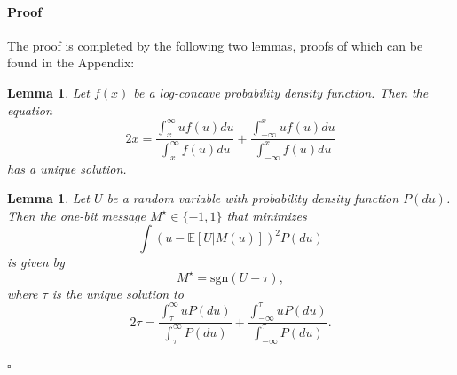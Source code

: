 \documentclass[letterpaper, conference,9pt]{IEEEtran}      %
\newtheorem{lem}[thm]{\bf {Lemma}}
\newenvironment{proof}{\paragraph*{Proof}}{\hfill$\square$ \newline}
\newcommand{\sgn}{\mathrm{sgn} }
\begin{document}
\begin{proof}
The proof is completed by the following two lemmas, proofs of which can be found in the Appendix:
\begin{lem} \label{lem:unique}
Let $f(x)$ be a log-concave probability density function. Then the equation 
\begin{equation}
\label{eq:lem_fixed_point}
2x = \frac{\int_x^\infty uf(u)du}{\int_x^\infty f(u)du} + \frac{\int_{-\infty}^x uf(u)du}{\int_{-\infty}^x f(u)du} 
\end{equation}
has a unique solution.
\end{lem}
\begin{lem} \label{lem:adaptive}
Let $U$ be a random variable with probability density function  $P(du)$. Then the one-bit message $M^\star\in \{-1,1\}$ that minimizes
\[
\int \left( u - \mathbb E[U|M(u)]  \right)^2 P(du)
\]
is given by
\[
M^\star  =  \sgn(U - \tau),
\]
where $\tau$ is the unique solution to
 \[
2 \tau = \frac{\int_{\tau}^\infty u P(du)} {\int_{\tau}^\infty P(du)} + \frac{\int_{-\infty}^{\tau} u P(du)}{\int_{-\infty}^{\tau} P(du)}.
\]
\end{lem}
\end{proof}
\end{document}
